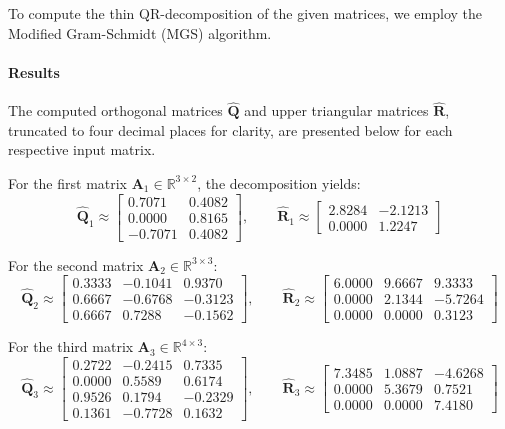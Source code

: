 \begin{solution}

	To compute the thin QR-decomposition of the given matrices, we employ the
	Modified Gram-Schmidt (MGS) algorithm.

	\paragraph{Results}
	The computed orthogonal matrices $\hat{\mathbf{Q}}$ and upper triangular
	matrices $\hat{\mathbf{R}}$, truncated to four decimal places for clarity,
	are presented below for each respective input matrix.

	For the first matrix $\mathbf{A}_1 \in \mathbb{R}^{3 \times 2}$, the
	decomposition yields:
	\[
		\hat{\mathbf{Q}}_1 \approx \begin{bmatrix}
			0.7071  & 0.4082 \\
			0.0000  & 0.8165 \\
			-0.7071 & 0.4082
		\end{bmatrix}, \qquad
		\hat{\mathbf{R}}_1 \approx \begin{bmatrix}
			2.8284 & -2.1213 \\
			0.0000 & 1.2247
		\end{bmatrix}
	\]

	For the second matrix $\mathbf{A}_2 \in \mathbb{R}^{3 \times 3}$:
	\[
		\hat{\mathbf{Q}}_2 \approx \begin{bmatrix}
			0.3333 & -0.1041 & 0.9370  \\
			0.6667 & -0.6768 & -0.3123 \\
			0.6667 & 0.7288  & -0.1562
		\end{bmatrix}, \qquad
		\hat{\mathbf{R}}_2 \approx \begin{bmatrix}
			6.0000 & 9.6667 & 9.3333  \\
			0.0000 & 2.1344 & -5.7264 \\
			0.0000 & 0.0000 & 0.3123
		\end{bmatrix}
	\]

	For the third matrix $\mathbf{A}_3 \in \mathbb{R}^{4 \times 3}$:
	\[
		\hat{\mathbf{Q}}_3 \approx \begin{bmatrix}
			0.2722 & -0.2415 & 0.7335  \\
			0.0000 & 0.5589  & 0.6174  \\
			0.9526 & 0.1794  & -0.2329 \\
			0.1361 & -0.7728 & 0.1632
		\end{bmatrix}, \qquad
		\hat{\mathbf{R}}_3 \approx \begin{bmatrix}
			7.3485 & 1.0887 & -4.6268 \\
			0.0000 & 5.3679 & 0.7521  \\
			0.0000 & 0.0000 & 7.4180
		\end{bmatrix}
	\]


\end{solution}
